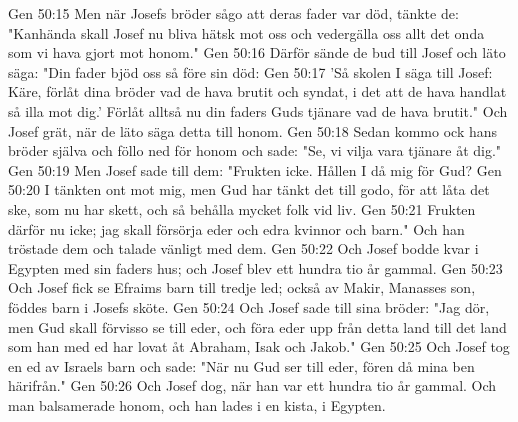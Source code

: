 Gen 50:15  Men när Josefs bröder sågo att deras fader var död, tänkte de: "Kanhända skall Josef nu bliva hätsk mot oss och vedergälla oss allt det onda som vi hava gjort mot honom."
Gen 50:16  Därför sände de bud till Josef och läto säga: "Din fader bjöd oss så före sin död:
Gen 50:17  'Så skolen I säga till Josef: Käre, förlåt dina bröder vad de hava brutit och syndat, i det att de hava handlat så illa mot dig.' Förlåt alltså nu din faders Guds tjänare vad de hava brutit." Och Josef grät, när de läto säga detta till honom.
Gen 50:18  Sedan kommo ock hans bröder själva och föllo ned för honom och sade: "Se, vi vilja vara tjänare åt dig."
Gen 50:19  Men Josef sade till dem: "Frukten icke. Hållen I då mig för Gud?
Gen 50:20  I tänkten ont mot mig, men Gud har tänkt det till godo, för att låta det ske, som nu har skett, och så behålla mycket folk vid liv.
Gen 50:21  Frukten därför nu icke; jag skall försörja eder och edra kvinnor och barn." Och han tröstade dem och talade vänligt med dem.
Gen 50:22  Och Josef bodde kvar i Egypten med sin faders hus; och Josef blev ett hundra tio år gammal.
Gen 50:23  Och Josef fick se Efraims barn till tredje led; också av Makir, Manasses son, föddes barn i Josefs sköte.
Gen 50:24  Och Josef sade till sina bröder: "Jag dör, men Gud skall förvisso se till eder, och föra eder upp från detta land till det land som han med ed har lovat åt Abraham, Isak och Jakob."
Gen 50:25  Och Josef tog en ed av Israels barn och sade: "När nu Gud ser till eder, fören då mina ben härifrån."
Gen 50:26  Och Josef dog, när han var ett hundra tio år gammal. Och man balsamerade honom, och han lades i en kista, i Egypten.


